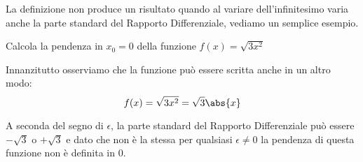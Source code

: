 La definizione non produce un risultato quando al variare 
dell'infinitesimo varia anche la parte standard del 
Rapporto Differenziale, vediamo un semplice esempio.
\begin{esempio}
Calcola la pendenza in \(x_0 = 0\) della funzione \(f(x) = \sqrt{3x^2}\)

Innanzitutto osserviamo che la funzione può essere scritta anche in un altro 
modo: 
\[f(x) = \sqrt{3x^2} = \sqrt{3} \abs{x}\]


A seconda del segno di \(\epsilon\), la parte standard del Rapporto 
Differenziale può essere \(-\sqrt{3}\) o \(+\sqrt{3}\) e dato che non è la 
stessa per qualsiasi \(\epsilon \ne 0\) la pendenza di questa funzione non è 
definita in \(0\).

\end{esempio}

